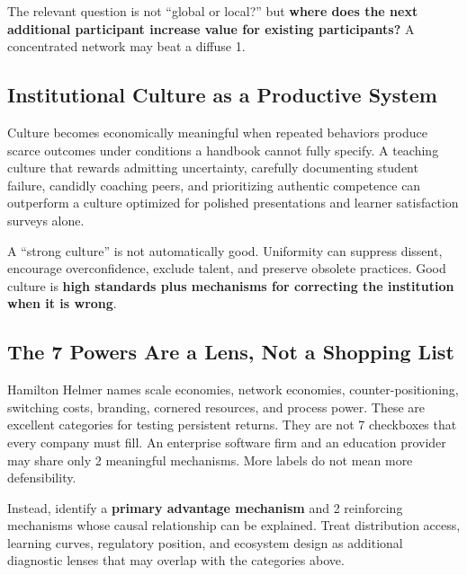 The relevant question is not ``global or local?'' but \textbf{where does the next additional participant increase value for existing participants?} A concentrated network may beat a diffuse 1.

\subsection{Institutional Culture as a Productive System}
\label{sec:institutional_culture_productive_system}

Culture becomes economically meaningful when repeated behaviors produce scarce outcomes under conditions a handbook cannot fully specify. A teaching culture that rewards admitting uncertainty, carefully documenting student failure, candidly coaching peers, and prioritizing authentic competence can outperform a culture optimized for polished presentations and learner satisfaction surveys alone.

A ``strong culture'' is not automatically good. Uniformity can suppress dissent, encourage overconfidence, exclude talent, and preserve obsolete practices. Good culture is \textbf{high standards plus mechanisms for correcting the institution when it is wrong}.

\subsection{The 7 Powers Are a Lens, Not a Shopping List}
\label{sec:seven_powers_lens}

Hamilton Helmer names scale economies, network economies, counter-positioning, switching costs, branding, cornered resources, and process power. These are excellent categories for testing persistent returns. They are not 7 checkboxes that every company must fill. An enterprise software firm and an education provider may share only 2 meaningful mechanisms. More labels do not mean more defensibility.

Instead, identify a \textbf{primary advantage mechanism} and 2 reinforcing mechanisms whose causal relationship can be explained. Treat distribution access, learning curves, regulatory position, and ecosystem design as additional diagnostic lenses that may overlap with the categories above.
